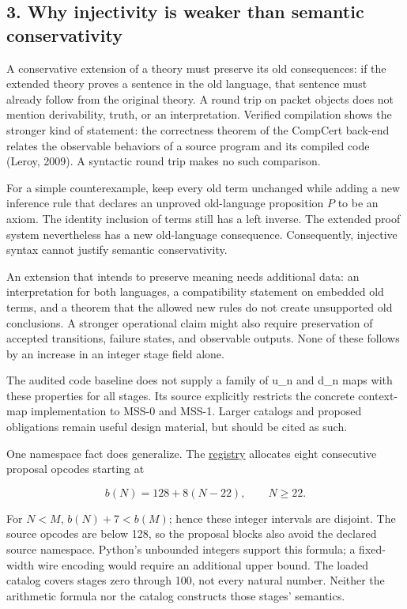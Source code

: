 \documentclass[
  11pt,
]{article}
\begin{document}
\hypertarget{why-injectivity-is-weaker-than-semantic-conservativity}{%
\subsection{3. Why injectivity is weaker than semantic
conservativity}\label{why-injectivity-is-weaker-than-semantic-conservativity}}

A conservative extension of a theory must preserve its old consequences:
if the extended theory proves a sentence in the old language, that
sentence must already follow from the original theory. A round trip on
packet objects does not mention derivability, truth, or an
interpretation. Verified compilation shows the stronger kind of
statement: the correctness theorem of the CompCert back-end relates the
observable behaviors of a source program and its compiled code (Leroy,
2009). A syntactic round trip makes no such comparison.

For a simple counterexample, keep every old term unchanged while adding
a new inference rule that declares an unproved old-language proposition
\(P\) to be an axiom. The identity inclusion of terms still has a left
inverse. The extended proof system nevertheless has a new old-language
consequence. Consequently, injective syntax cannot justify semantic
conservativity.

An extension that intends to preserve meaning needs additional data: an
interpretation for both languages, a compatibility statement on embedded
old terms, and a theorem that the allowed new rules do not create
unsupported old conclusions. A stronger operational claim might also
require preservation of accepted transitions, failure states, and
observable outputs. None of these follows by an increase in an integer
stage field alone.

The audited code baseline does not supply a family of u\_n and d\_n maps
with these properties for all stages. Its source explicitly restricts
the concrete context-map implementation to MSS-0 and MSS-1. Larger
catalogs and proposed obligations remain useful design material, but
should be cited as such.

One namespace fact does generalize. The
\href{https://github.com/dbccpage/the_symbol_game/blob/52cb5457f6c485ba548cfd292f6012a941ed22cf/research/mssn_sn_tower/code/python/registry.py}{registry}
allocates eight consecutive proposal opcodes starting at

\[
b(N)=128+8(N-22),\qquad N\geq22.
\]

For \(N<M\), \(b(N)+7<b(M)\); hence these integer intervals are
disjoint. The source opcodes are below 128, so the proposal blocks also
avoid the declared source namespace. Python's unbounded integers support
this formula; a fixed-width wire encoding would require an additional
upper bound. The loaded catalog covers stages zero through 100, not
every natural number. Neither the arithmetic formula nor the catalog
constructs those stages' semantics.
\end{document}
